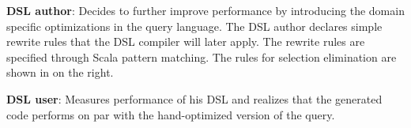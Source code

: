 \documentclass{llncs}
\begin{document}
  {\bf DSL author}: Decides to further improve performance by introducing the domain specific optimizations in the query language. The DSL author declares simple rewrite rules that the DSL compiler will later apply. The rewrite rules are specified through Scala pattern matching. The rules for selection elimination are shown in  on the right.

  {\bf DSL user}: Measures performance of his DSL and realizes that the generated code performs on par with the hand-optimized version of the query.




\end{document}
